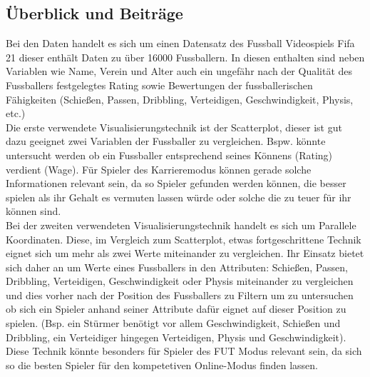 \documentclass[usegeometry=true]{scrartcl}
\begin{document}
\subsection{Überblick und Beiträge}



Bei den Daten handelt es sich um einen Datensatz des Fussball Videospiels Fifa 21 dieser enthält Daten zu über 16000 Fussballern. In diesen enthalten sind neben Variablen wie Name, Verein und Alter auch ein ungefähr nach der Qualität des Fussballers festgelegtes Rating sowie Bewertungen der fussballerischen Fähigkeiten (Schießen, Passen, Dribbling, Verteidigen, Geschwindigkeit, Physis, etc.)\\

Die erste verwendete Visualisierungstechnik ist der Scatterplot, dieser ist gut dazu geeignet zwei Variablen der Fussballer zu vergleichen. Bspw. könnte untersucht werden ob ein Fussballer entsprechend seines Könnens (Rating) verdient (Wage). Für Spieler des Karrieremodus können gerade solche Informationen relevant sein, da so Spieler gefunden werden können, die besser spielen als ihr Gehalt es vermuten lassen würde oder solche die zu teuer für ihr können sind.\\

Bei der zweiten verwendeten Visualisierungstechnik handelt es sich um Parallele Koordinaten. Diese, im Vergleich zum Scatterplot, etwas fortgeschrittene Technik eignet sich um mehr als zwei Werte miteinander zu vergleichen. Ihr Einsatz bietet sich daher an um Werte eines Fussballers in den Attributen: Schießen, Passen, Dribbling, Verteidigen, Geschwindigkeit oder Physis miteinander zu vergleichen und dies vorher nach der Position des Fussballers zu Filtern um zu untersuchen ob sich ein Spieler anhand seiner Attribute dafür eignet auf dieser Position zu spielen. (Bsp. ein Stürmer benötigt vor allem Geschwindigkeit, Schießen und Dribbling, ein Verteidiger hingegen Verteidigen, Physis und Geschwindigkeit).
Diese Technik könnte besonders für Spieler des FUT Modus relevant sein, da sich so die besten Spieler für den kompetetiven Online-Modus finden lassen.\\
\end{document}
